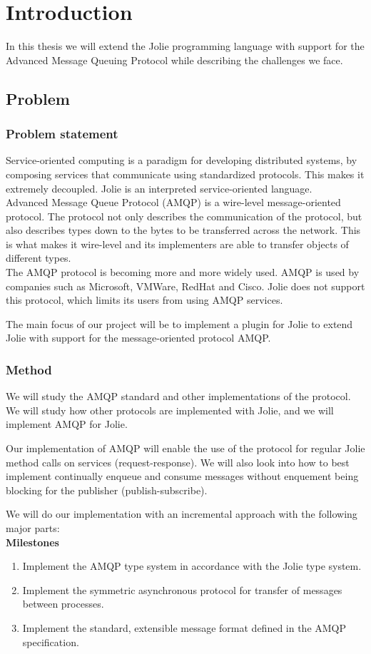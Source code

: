 \section{Introduction}
In this thesis we will extend the Jolie programming language with support for the Advanced Message Queuing Protocol while describing the challenges we face.
\subsection{Problem}
\subsubsection{Problem statement}
Service-oriented computing is a paradigm for developing distributed systems, by composing services that communicate using standardized protocols. This makes it extremely decoupled. Jolie is an interpreted service-oriented language.\\
Advanced Message Queue Protocol (AMQP) is a wire-level message-oriented protocol. The protocol not only describes the communication of the protocol, but also describes types down to the bytes to be transferred across the network. This is what makes it wire-level and its implementers are able to transfer objects of different types.\\
The AMQP protocol is becoming more and more widely used. AMQP is used by companies such as Microsoft, VMWare, RedHat and Cisco. Jolie does not support this protocol, which limits its users from using AMQP services.

The main focus of our project will be to implement a plugin for Jolie to extend Jolie with support for the message-oriented protocol AMQP.
\subsubsection{Method}
We will study the AMQP standard and other implementations of the protocol. We will study how other protocols are implemented with Jolie, and we will implement AMQP for Jolie.

Our implementation of AMQP will enable the use of the protocol for regular Jolie method calls on services (request-response). We will also look into how to best implement continually enqueue and consume messages without enquement being blocking for the publisher (publish-subscribe).

We will do our implementation with an incremental approach with the following major parts:
\\\textbf{Milestones}
\begin{enumerate}
\item Implement the AMQP type system in accordance with the Jolie type system.
\item Implement the symmetric asynchronous protocol for transfer of messages between processes.
\item Implement the standard, extensible message format defined in the AMQP specification.
\end{enumerate}


